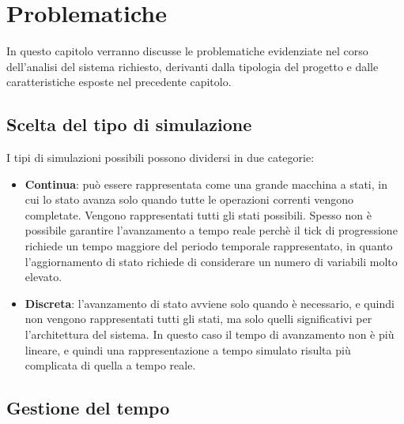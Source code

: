 \chapter{Problematiche} %

\label{Chapter2} %


In questo capitolo verranno discusse le problematiche evidenziate nel corso dell'analisi del sistema richiesto, derivanti dalla tipologia del progetto e dalle caratteristiche esposte nel precedente capitolo.


\section{Scelta del tipo di simulazione}

I tipi di simulazioni possibili possono dividersi in due categorie:
\begin{itemize}
 \item \textbf{Continua}: può essere rappresentata come una grande macchina a stati, in cui lo stato avanza solo quando tutte le operazioni correnti vengono completate. Vengono rappresentati tutti gli stati possibili. Spesso non è possibile garantire l'avanzamento a tempo reale perchè il tick di progressione richiede un tempo maggiore del periodo temporale rappresentato, in quanto l'aggiornamento di stato richiede di considerare un numero di variabili molto elevato.
 \item \textbf{Discreta}: l’avanzamento di stato avviene solo quando è necessario, e quindi non vengono rappresentati tutti gli stati, ma solo quelli significativi per l’architettura del sistema. In questo caso il tempo di avanzamento non è più lineare, e quindi una rappresentazione a tempo simulato risulta più complicata di quella a tempo reale.
\end{itemize}

\section{Gestione del tempo}

